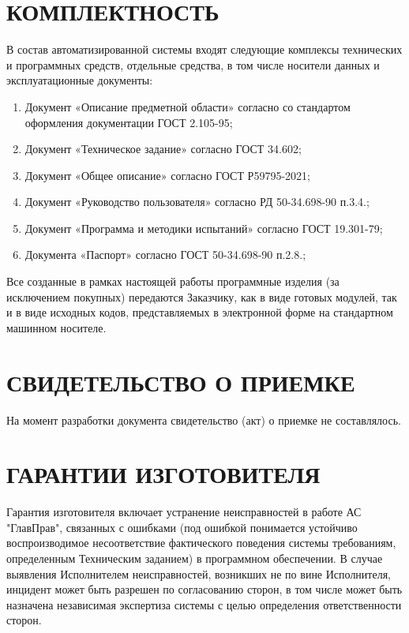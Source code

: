 \documentclass[russian, utf8, 12pt,pointsubsection,floatsubsection]{eskdtext}
\begin{document}
\section{КОМПЛЕКТНОСТЬ} 
В состав автоматизированной системы входят следующие комплексы технических и программных средств, отдельные средства, в том числе носители данных и эксплуатационные документы:
\begin{enumerate}
    \item Документ «Описание предметной области» согласно со стандартом оформления документации ГОСТ 2.105-95;
    \item Документ «Техническое задание» согласно ГОСТ 34.602;
    \item Документ «Общее описание» согласно ГОСТ Р59795-2021;
    \item Документ «Руководство пользователя» согласно РД 50-34.698-90 п.3.4.;
    \item Документ «Программа и методики испытаний» согласно ГОСТ 19.301-79;
    \item Документа «Паспорт» согласно ГОСТ 50-34.698-90 п.2.8.;
\end{enumerate}

Все созданные в рамках настоящей работы программные изделия (за исключением покупных) передаются Заказчику, как в виде готовых модулей, так и в виде исходных кодов, представляемых в электронной форме на стандартном машинном носителе.\\

\section{СВИДЕТЕЛЬСТВО О ПРИЕМКЕ}
На момент разработки документа свидетельство (акт) о приемке не составлялось.

\section{ГАРАНТИИ ИЗГОТОВИТЕЛЯ} 
Гарантия изготовителя включает устранение неисправностей в работе АС "ГлавПрав", связанных с ошибками (под ошибкой понимается устойчиво воспроизводимое несоответствие фактического поведения системы требованиям, определенным Техническим заданием) в программном обеспечении. В случае выявления Исполнителем неисправностей, возникших не по вине Исполнителя, инцидент может быть разрешен по согласованию сторон, в том числе может быть
назначена независимая экспертиза системы с целью определения ответственности сторон.\\
\end{document}
